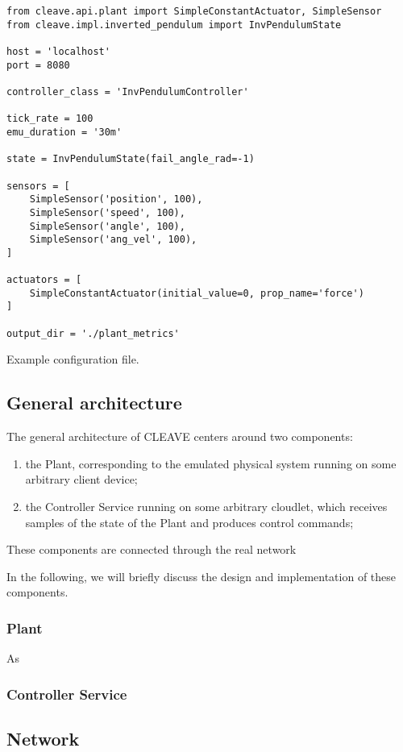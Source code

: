 \begin{listing}
    \begin{verbatim}
from cleave.api.plant import SimpleConstantActuator, SimpleSensor
from cleave.impl.inverted_pendulum import InvPendulumState

host = 'localhost'
port = 8080

controller_class = 'InvPendulumController'

tick_rate = 100
emu_duration = '30m'

state = InvPendulumState(fail_angle_rad=-1)

sensors = [
    SimpleSensor('position', 100),
    SimpleSensor('speed', 100),
    SimpleSensor('angle', 100),
    SimpleSensor('ang_vel', 100),
]

actuators = [
    SimpleConstantActuator(initial_value=0, prop_name='force')
]

output_dir = './plant_metrics'
    \end{verbatim}
    \caption{Example configuration file.}
    \label{lst:config}
\end{listing}



\subsection{General architecture}

The general architecture of CLEAVE centers around two components:

\begin{enumerate}
    \item the Plant, corresponding to the emulated physical system running on some arbitrary client device;
    \item the Controller Service running on some arbitrary cloudlet, which receives samples of the state of the Plant and produces control commands;
\end{enumerate}

These components are connected through the real network 

In the following, we will briefly discuss the design and implementation of these components.

\subsubsection{Plant}

As 

\subsubsection{Controller Service}
\subsection{Network}